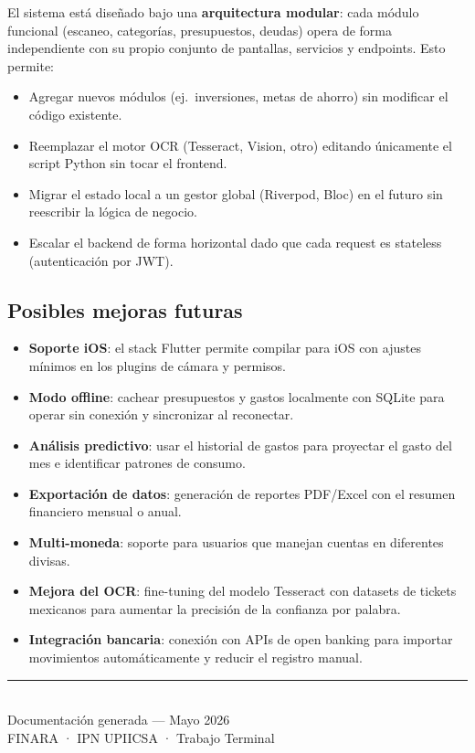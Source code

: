 \documentclass[12pt, letterpaper]{article}
\begin{document}
El sistema está diseñado bajo una \textbf{arquitectura modular}: cada módulo
funcional (escaneo, categorías, presupuestos, deudas) opera de forma
independiente con su propio conjunto de pantallas, servicios y endpoints.
Esto permite:

\begin{itemize}
  \item Agregar nuevos módulos (ej.\ inversiones, metas de ahorro) sin
        modificar el código existente.
  \item Reemplazar el motor OCR (Tesseract, Vision, otro) editando
        únicamente el script Python sin tocar el frontend.
  \item Migrar el estado local a un gestor global (Riverpod, Bloc) en el
        futuro sin reescribir la lógica de negocio.
  \item Escalar el backend de forma horizontal dado que cada request es
        stateless (autenticación por JWT).
\end{itemize}

\subsection{Posibles mejoras futuras}

\begin{itemize}
  \item \textbf{Soporte iOS}: el stack Flutter permite compilar para iOS con
        ajustes mínimos en los plugins de cámara y permisos.
  \item \textbf{Modo offline}: cachear presupuestos y gastos localmente con
        SQLite para operar sin conexión y sincronizar al reconectar.
  \item \textbf{Análisis predictivo}: usar el historial de gastos para
        proyectar el gasto del mes e identificar patrones de consumo.
  \item \textbf{Exportación de datos}: generación de reportes PDF/Excel
        con el resumen financiero mensual o anual.
  \item \textbf{Multi-moneda}: soporte para usuarios que manejan cuentas
        en diferentes divisas.
  \item \textbf{Mejora del OCR}: fine-tuning del modelo Tesseract con
        datasets de tickets mexicanos para aumentar la precisión de la
        confianza por palabra.
  \item \textbf{Integración bancaria}: conexión con APIs de open banking
        para importar movimientos automáticamente y reducir el registro
        manual.
\end{itemize}

\vspace{1.2cm}
\begin{center}
  \textcolor{bordesutil}{\rule{0.5\textwidth}{0.4pt}}\\[0.5em]
  {\small\color{gray}
    Documentación generada — Mayo 2026 \\
    FINARA · IPN UPIICSA · Trabajo Terminal
  }
\end{center}
\end{document}
